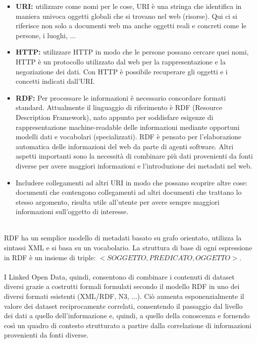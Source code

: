 \documentclass{article}
\theoremstyle{plain}
\theoremstyle{definition}
\begin{document}
\begin{itemize}

\item \textbf{URI:} utilizzare  come nomi per le cose,  URI è una stringa che identifica in maniera univoca oggetti globali che si trovano nel web (risorse). Qui ci si riferisce non solo a documenti web ma anche oggetti reali e concreti come le persone, i luoghi, ...
\item \textbf{HTTP:} utilizzare HTTP in modo che le persone possano cercare quei nomi, HTTP è un protocollo utilizzato dal web per la rappresentazione e la negoziazione dei dati. Con HTTP è possibile recuperare gli oggetti e i concetti indicati dall'URI.

\item \textbf{RDF:} Per processare le informazioni è necessario concordare formati standard. Attualmente il linguaggio di riferimento è RDF (Resource Description Framework), nato appunto per soddisfare esigenze di rappresentazione machine-readable delle informazioni mediante opportuni modelli dati e vocabolari (specializzati). RDF è pensato per l'elaborazione automatica delle informazioni del web da parte di agenti software. Altri aspetti importanti sono la necessità di combinare più dati provenienti da fonti diverse per avere maggiori informazioni e l'introduzione dei metadati nel web.

\item Includere collegamenti ad altri URI in modo che possano scoprire altre cose: documenti che contengono collegamenti ad altri documenti che trattano lo stesso argomento, risulta utile all'utente per avere sempre maggiori informazioni sull'oggetto di interesse. 

\end{itemize} 
\phantom
\\
RDF ha un semplice modello di metadati basato su grafo orientato, utilizza la sintassi XML e si basa su un vocabolario. La struttura di base di ogni espressione in RDF è un insieme di triple: $<SOGGETTO, PREDICATO, OGGETTO>$.
\\
\\
I Linked Open Data, quindi, consentono di combinare i contenuti di dataset diversi grazie a costrutti formali formulati secondo il modello RDF in uno dei diversi formati esistenti (XML/RDF, N3, ...). Ciò aumenta esponenzialmente il valore dei dataset reciprocamente correlati, consentendo il passaggio dal livello dei dati a quello dell'informazione e, quindi, a quello della conoscenza e fornendo così un quadro di contesto strutturato a partire dalla correlazione di informazioni provenienti da fonti diverse.
\end{document}
